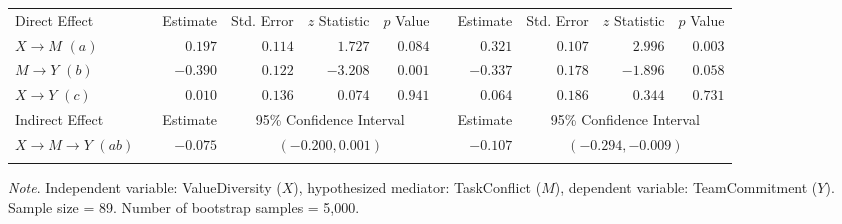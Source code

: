 \documentclass{article}\usepackage[]{graphicx}\usepackage[]{xcolor}
\begin{document}
\begin{sidewaystable}[h!]
\begin{center}
\begin{tabular}{llrrrrlrrrr}
\noalign{\smallskip}\hline\noalign{\smallskip}
Direct Effect &  & Estimate & Std. Error & $z$ Statistic & $p$ Value &  & Estimate & Std. Error & $z$ Statistic & $p$ Value \\ 
\noalign{\smallskip}\hline\noalign{\smallskip}
$X \rightarrow M$ $(a)$ &  & $ 0.197$ & $ 0.114$ & $ 1.727$ & $ 0.084$ &  & $ 0.321$ & $ 0.107$ & $ 2.996$ & $ 0.003$ \\ 
$M \rightarrow Y$ $(b)$ &  & $-0.390$ & $ 0.122$ & $-3.208$ & $ 0.001$ &  & $-0.337$ & $ 0.178$ & $-1.896$ & $ 0.058$ \\ 
$X \rightarrow Y$ $(c)$ &  & $ 0.010$ & $ 0.136$ & $ 0.074$ & $ 0.941$ &  & $ 0.064$ & $ 0.186$ & $ 0.344$ & $ 0.731$ \\ 
\noalign{\smallskip}\hline\noalign{\smallskip}
Indirect Effect &  & Estimate & \multicolumn{3}{c}{95\% Confidence Interval} &  & Estimate & \multicolumn{3}{c}{95\% Confidence Interval} \\ 
\noalign{\smallskip}\hline\noalign{\smallskip}
$X \rightarrow M \rightarrow Y$ $(ab)$ &  & $-0.075$ & \multicolumn{3}{c}{$(-0.200,  0.001)$} &  & $-0.107$ & \multicolumn{3}{c}{$(-0.294, -0.009)$} \\ 
\noalign{\smallskip}\hline
\end{tabular}
\end{center}
\emph{Note}. Independent variable: ValueDiversity ($X$), hypothesized mediator: TaskConflict ($M$), dependent variable: TeamCommitment ($Y$). Sample size = 89. Number of bootstrap samples = 5,000. 

\end{sidewaystable}
\end{document}
